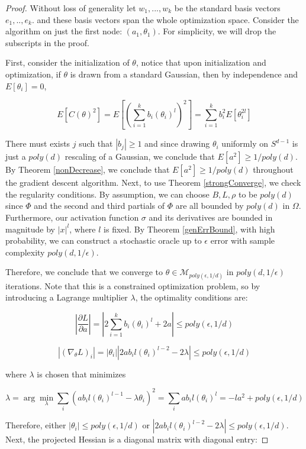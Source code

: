 \documentclass{article}
\newcommand{\pd}[2]{\frac{\partial#1}{\partial#2}}
\begin{document}
\begin{proof}
Without loss of generality let $w_1,...,w_k$ be the standard basis vectors $e_1,..,e_k$. and these basis vectors span the whole optimization space. Consider the algorithm on just the first node: $(a_1,\theta_1)$. For simplicity, we will drop the subscripts in the proof. 

First, consider the initialization of $\theta$, notice that upon initialization and optimization, if $\theta$ is drawn from a standard Gaussian, then by independence and $E[\theta_i] = 0$,

\[E[C(\theta)^2] = E\left[\left(\sum_{i=1}^k  b_i (\theta_i)^l\right)^2\right] = \sum_{i=1}^k b_i^2E[\theta_i^{2l}]\]

There must exists $j$ such that $|b_j|\geq 1$ and since drawing $\theta_i$ uniformly on $S^{d-1}$ is just a $poly(d)$ rescaling of a Gaussian, we conclude that $E[a^2]\geq1/poly(d)$. By Theorem \ref{nonDecrease}, we conclude that $E[a^2] \geq 1/poly(d)$ throughout the gradient descent algorithm. Next, to use Theorem \ref{strongConverge}, we check the regularity conditions. By assumption, we can choose $B, L, \rho$ to be $poly(d)$ since $\Phi$ and the second and third partials of $\Phi$ are all bounded by $poly(d)$ in $\Omega$. Furthermore, our activation function $\sigma$ and its derivatives are bounded in magnitude by $|x|^{l}$, where $l$ is fixed. By Theorem \ref{genErrBound}, with high probability, we can construct a stochastic oracle up to $\epsilon$ error with sample complexity $poly(d,1/\epsilon)$.


Therefore, we conclude that we converge to $\theta \in \mathcal{M}_{poly(\epsilon,1/d)}$ in $poly(d,1/\epsilon)$ iterations. Note that this is a constrained optimization problem, so by introducing a Lagrange multiplier $\lambda$, the optimality conditions are:

\[|\pd{L}{a}| = |2\sum_{i=1}^k b_i (\theta_i)^l + 2a| \leq poly(\epsilon,1/d)\]

\[ |(\nabla_\theta L)_i| = |\theta_i||2ab_il(\theta_i)^{l-2}  -2\lambda| \leq poly(\epsilon,1/d)  \]

where $\lambda$ is chosen that minimizes 

\[\lambda = \arg \min_\lambda \sum_i (ab_i l (\theta_i)^{l-1} - \lambda\theta_i)^2 = \sum_i ab_i l (\theta_i)^l = -la^2 + poly(\epsilon,1/d) \]


Therefore, either $|\theta_i| \leq poly(\epsilon,1/d)$ or $|2ab_il(\theta_i)^{l-2} - 2 \lambda |\leq poly(\epsilon,1/d)$. Next, the projected Hessian is a diagonal matrix with diagonal entry: 


\end{proof}
\end{document}
